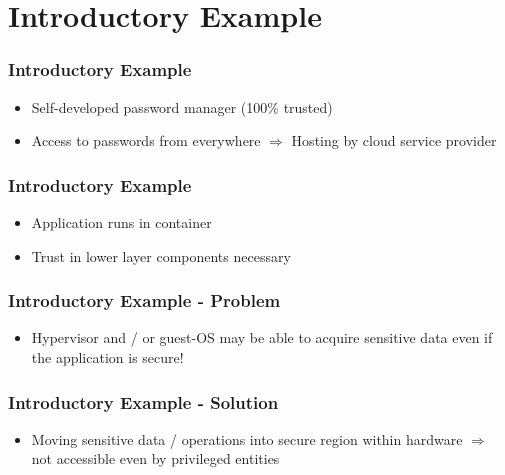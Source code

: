 \section{Introductory Example}
\begin{frame}
    \frametitle{Introductory Example}
    \begin{itemize}
        \item Self-developed password manager (100\% trusted)
        \item Access to passwords from everywhere \newline$ \Rightarrow$ Hosting by cloud service provider
    \end{itemize}
    \centering
\end{frame}

\begin{frame}
    \frametitle{Introductory Example}
    \begin{itemize}
        \item Application runs in container
        \item Trust in lower layer components necessary
    \end{itemize}
    \centering
\end{frame}

\begin{frame}
    \frametitle{Introductory Example - Problem}
    \begin{itemize}
        \item Hypervisor and / or guest-OS may be able to acquire sensitive data even if the application is secure! \newline \linebreak
    \end{itemize}
    \centering
\end{frame}

\begin{frame}
    \frametitle{Introductory Example - Solution}
    \begin{itemize}
        \item Moving sensitive data / operations into secure region within hardware \newline $\Rightarrow$ not accessible even by privileged entities
    \end{itemize}
    \centering
\end{frame}

